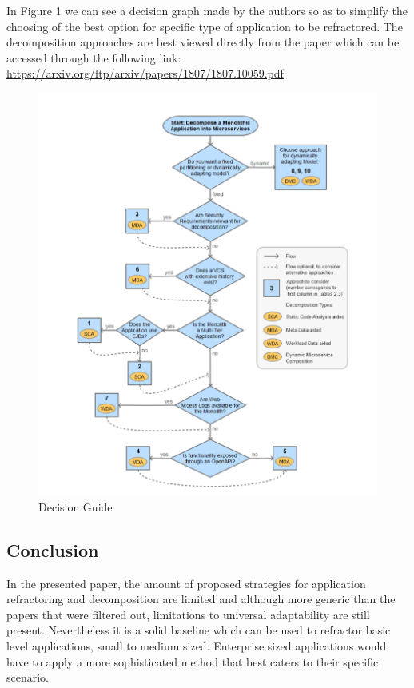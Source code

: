 \documentclass[14pt]{extarticle}
\begin{document}
In Figure 1 we can see a decision graph made by the authors so as to simplify the choosing of the best option for specific type of application to be refractored. The decomposition approaches are best viewed directly from the paper which can be accessed through the following link: \url{https://arxiv.org/ftp/arxiv/papers/1807/1807.10059.pdf}

\begin{figure}[H]
  \centering
    \includegraphics[scale=0.5]{Decision_Graph.png}
  \caption{Decision Guide}
\end{figure}
\noindent

\subsection{Conclusion}
In the presented paper, the amount of proposed strategies for application refractoring and decomposition are limited and although more generic than the papers that were filtered out, limitations to universal adaptability are still present. Nevertheless it is a solid baseline which can be used to refractor basic level applications, small to medium sized. Enterprise sized applications would have to apply a more sophisticated method that best caters to their specific scenario.
\end{document}
